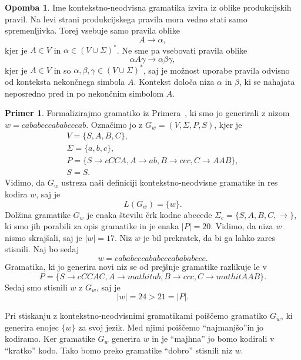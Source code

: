 \documentclass{amsart}
\theoremstyle{definition}
\newtheorem{primer}[definicija]{Primer}
\newtheorem{opomba}[definicija]{Opomba}
\theoremstyle{plain} %
\begin{document}
\begin{opomba}
    
    Ime kontekstno-neodvisna gramatika izvira iz oblike produkcijskih pravil. Na levi
    strani produkcijskega pravila mora vedno stati samo spremenljivka. Torej vsebuje samo
    pravila oblike
    \[
        A \rightarrow \alpha,
    \]
    kjer je  $ A \in V $ in $ \alpha \in ( V \cup \Sigma )^* $. Ne sme pa vsebovati
    pravila oblike
    \[
        \alpha A \gamma \rightarrow \alpha\beta\gamma,
    \]
    kjer je $ A \in V $ in so $ \alpha, \beta, \gamma \in ( V \cup \Sigma )^* $, saj je možnost uporabe
    pravila odvisno od konteksta nekončnega simbola $ A $. Kontekst določa niza $ \alpha $ in $ \beta $,
    ki se nahajata neposredno pred in po nekončnim simbolom $ A $.

\end{opomba}

\begin{primer}
    
    Formalizirajmo gramatiko iz Primera~, ki smo jo generirali z nizom
    $ w = \mathit{cababcccababcccab} $. Označimo jo z $ G_w = ( V, \Sigma, P, S ) $, kjer je 
    \begin{gather*}
        V = \{ S, A, B, C \}, \\
        \Sigma = \{ a, b, c \}, \\
        P = \{ S  \rightarrow  \mathit{cCCA}, A  \rightarrow  \mathit{ab}, B  
        \rightarrow  \mathit{ccc}, C  \rightarrow  \mathit{AAB} \}, \\
        S = S.
    \end{gather*}
    Vidimo, da $ G_w $ ustreza naši definiciji kontekstno-neodvisne gramatike
    in res kodira $ w $, saj je 
    \[
        L(G_w) = \{w\}.
    \]
    Dolžina gramatike $ G_w $ je enaka številu črk kodne abecede $ \Sigma_c = \{ S, A, B, C, \rightarrow \} $,
    ki smo jih porabili za opis gramatike in je enaka $ |P| = 20 $. Vidimo, da niza $ w $ 
    nismo skrajšali, saj je $ |w| = 17 $. Niz $ w $ je bil prekratek, da bi ga lahko
    zares stisnili. Naj bo sedaj
    \[
        w =   \mathit{cababcccababcccabababccc}.
    \]
    Gramatika, ki jo generira novi niz se od prejšnje gramatike razlikuje le v
    \[
        P = \{ S  \rightarrow  \mathit{cCCAC}, A  \rightarrow  mathit{ab}, B  
        \rightarrow  \mathit{ccc}, C  \rightarrow  mathit{AAB} \}.
    \]
    Sedaj smo stisnili $ w $ z $ G_w $, saj je
    \[
        |w| = 24 > 21 = |P|.
    \]

\end{primer}

Pri stiskanju z kontekstno-neodvisnimi gramatikami poiščemo gramatiko $ G_w $, ki generira
enojec $ \{ w \} $ za svoj jezik. Med njimi poiščemo ``najmanjšo''in jo kodiramo.
Ker gramatike $ G_w $ generira $ w $ in je ``majhna'' jo bomo kodirali v ``kratko'' kodo.
Tako bomo preko gramatike ``dobro'' stisnili niz $ w $.
\end{document}
